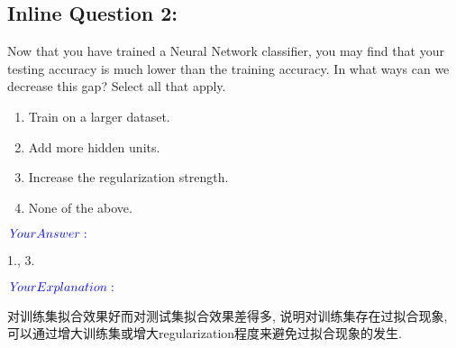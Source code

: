 \documentclass[11pt]{article}
\makeatletter
\providecommand{\tightlist}{%
      \setlength{\itemsep}{0pt}\setlength{\parskip}{0pt}}
\newcommand{\boxspacing}{\kern\kvtcb@left@rule\kern\kvtcb@boxsep}
\newcommand{\prompt}[4]{
        {\ttfamily\llap{{\color{#2}[#3]:\hspace{3pt}#4}}\vspace{-\baselineskip}}
    }
\makeatother
\begin{document}
    \hypertarget{inline-question-2}{%
\subsection{Inline Question 2:}\label{inline-question-2}}

Now that you have trained a Neural Network classifier, you may find that
your testing accuracy is much lower than the training accuracy. In what
ways can we decrease this gap? Select all that apply.

\begin{enumerate}
\def\labelenumi{\arabic{enumi}.}
\tightlist
\item
  Train on a larger dataset.
\item
  Add more hidden units.
\item
  Increase the regularization strength.
\item
  None of the above.
\end{enumerate}

\(\color{blue}{\textit Your Answer:}\)

1., 3.

\(\color{blue}{\textit Your Explanation:}\)

对训练集拟合效果好而对测试集拟合效果差得多, 说明对训练集存在过拟合现象,
可以通过增大训练集或增大regularization程度来避免过拟合现象的发生.

    \begin{tcolorbox}[breakable, size=fbox, boxrule=1pt, pad at break*=1mm,colback=cellbackground, colframe=cellborder]
\prompt{In}{incolor}{ }{\boxspacing}
\begin{Verbatim}[commandchars=\\\{\}]

\end{Verbatim}
\end{tcolorbox}


    
    
    
\end{document}
